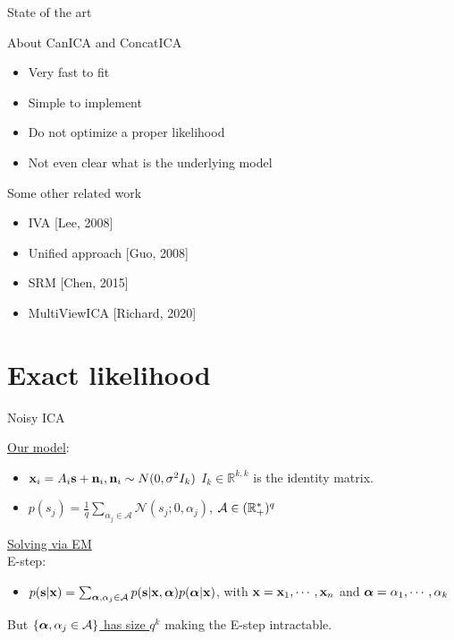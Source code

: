 \documentclass[bigger]{beamer}
\begin{document}
\begin{frame}{State of the art}
  \begin{block}{About CanICA and ConcatICA}
    \begin{itemize}
    \item Very fast to fit
    \item Simple to implement
    \item Do not optimize a proper likelihood
    \item Not even clear what is the underlying model
    \end{itemize}
  \end{block}

  \begin{block}{Some other related work}
    \begin{itemize}
    \item IVA [Lee, 2008] 
    \item Unified approach [Guo, 2008] 
    \item SRM [Chen, 2015] 
      \item MultiViewICA [Richard, 2020]
    \end{itemize}
  \end{block}
\end{frame}


\section{Exact likelihood}
\label{sec:org55f3e63}
\begin{frame}{Noisy ICA}
\begin{example}
  \underline{Our model}:
\begin{itemize}
\item $\mathbf{x}_i = A_i \mathbf{s} + \mathbf{n}_i, \mathbf{n}_i \sim N(0, \sigma^2 I_{k})$
  $I_{k} \in \mathbb{R}^{k, k}$ is the identity matrix.
\item $p(s_j) = \frac1{q} \sum_{\alpha_j \in \mathcal{A}} \mathcal{N}( s_j; 0,
  \alpha_j)$,  $\mathcal{A} \in (\mathbb{R}^*_+)^q$\\
\end{itemize}

\underline{Solving via EM}\\
E-step: \\
\begin{itemize}
\item $p(\mathbf{s} | \mathbf{x}) = \sum_{\bm{\alpha}, \alpha_j \in \mathcal{A}} p(\mathbf{s} | \mathbf{x},
  \bm{\alpha}) p(\bm{\alpha} | \mathbf{x})$, with $\mathbf{x} = \mathbf{x}_1,  \cdots, \mathbf{x}_n$ and $\bm{\alpha} =
  \alpha_1, \cdots, \alpha_k$
\end{itemize}

  But \underline{$\{\bm{\alpha}, \alpha_j \in \mathcal{A}\}$ has size $q^k$} making the E-step intractable.
\end{example}
\end{frame}
\end{document}
